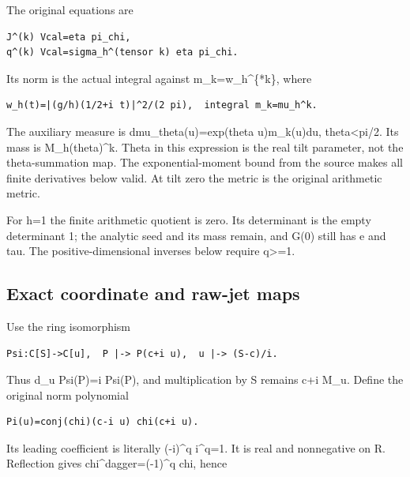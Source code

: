 The original equations are

\begin{Verbatim}[breaklines=true,breakanywhere=true,fontsize=\small]
J^(k) Vcal=eta pi_chi,
q^(k) Vcal=sigma_h^(tensor k) eta pi_chi.
\end{Verbatim}

Its norm is the actual integral against m\_k=w\_h\^{}\{*k\}, where

\begin{Verbatim}[breaklines=true,breakanywhere=true,fontsize=\small]
w_h(t)=|(g/h)(1/2+i t)|^2/(2 pi),  integral m_k=mu_h^k.
\end{Verbatim}

The auxiliary measure is dmu\_theta(u)=exp(theta u)m\_k(u)du,
\textbar theta\textbar\textless pi/2. Its mass is M\_h(theta)\^{}k.
Theta in this expression is the real tilt parameter, not the
theta-summation map. The exponential-moment bound from the source makes
all finite derivatives below valid. At tilt zero the metric is the
original arithmetic metric.

For h=1 the finite arithmetic quotient is zero. Its determinant is the
empty determinant 1; the analytic seed and its mass remain, and G(0)
still has e and tau. The positive-dimensional inverses below require
q\textgreater=1.

\subsection[\hspace{0.4em}Exact coordinate and raw-jet
maps]{Exact coordinate and raw-jet
maps}\label{confluent-transfer-exact-coordinate-and-raw-jet-maps}

Use the ring isomorphism

\begin{Verbatim}[breaklines=true,breakanywhere=true,fontsize=\small]
Psi:C[S]->C[u],  P |-> P(c+i u),  u |-> (S-c)/i.
\end{Verbatim}

Thus d\_u Psi(P)=i Psi(P\textquotesingle), and multiplication by S
remains c+i M\_u. Define the original norm polynomial

\begin{Verbatim}[breaklines=true,breakanywhere=true,fontsize=\small]
Pi(u)=conj(chi)(c-i u) chi(c+i u).
\end{Verbatim}

Its leading coefficient is literally (-i)\^{}q i\^{}q=1. It is real and
nonnegative on R. Reflection gives chi\^{}dagger=(-1)\^{}q chi, hence

